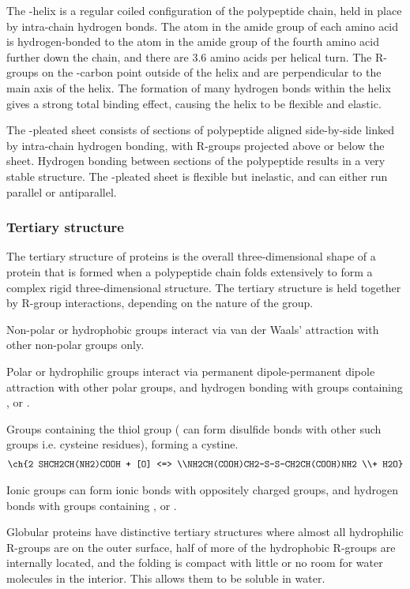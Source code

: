 \documentclass[Chemistry.tex]{subfiles}
\begin{document}
The \mupalpha-helix is a regular coiled configuration of the polypeptide chain, held in place by intra-chain hydrogen bonds. The  atom in the amide group of each amino acid is hydrogen-bonded to the  atom in the amide group of the fourth amino acid further down the chain, and there are \num{3.6} amino acids per helical turn. The R-groups on the \mupalpha-carbon point outside of the helix and are perpendicular to the main axis of the helix. The formation of many hydrogen bonds within the helix gives a strong total binding effect, causing the helix to be flexible and elastic.

The \mupbeta-pleated sheet consists of sections of polypeptide aligned side-by-side linked by intra-chain hydrogen bonding, with R-groups projected above or below the sheet. Hydrogen bonding between sections of the polypeptide results in a very stable structure. The \mupbeta-pleated sheet is flexible but inelastic, and can either run parallel or antiparallel.
\subsubsection{Tertiary structure}
The tertiary structure of proteins is the overall three-dimensional shape of a protein that is formed when a polypeptide chain folds extensively to form a complex rigid three-dimensional structure. The tertiary structure is held together by R-group interactions, depending on the nature of the group.

Non-polar or hydrophobic groups interact via van der Waals' attraction with other non-polar groups only.

Polar or hydrophilic groups interact via permanent dipole-permanent dipole attraction with other polar groups, and hydrogen bonding with groups containing ,  or .

Groups containing the thiol group ( can form disulfide bonds with other such groups i.e. cysteine residues), forming a cystine. \begin{multline}\ch{2 SHCH2CH(NH2)COOH + [O] <=> \\NH2CH(COOH)CH2-S-S-CH2CH(COOH)NH2 \\+ H2O}\end{multline}

Ionic groups can form ionic bonds with oppositely charged groups, and hydrogen bonds with groups containing ,  or .

Globular proteins have distinctive tertiary structures where almost all hydrophilic R-groups are on the outer surface, half of more of the hydrophobic R-groups are internally located, and the folding is compact with little or no room for water molecules in the interior. This allows them to be soluble in water.
\end{document}
